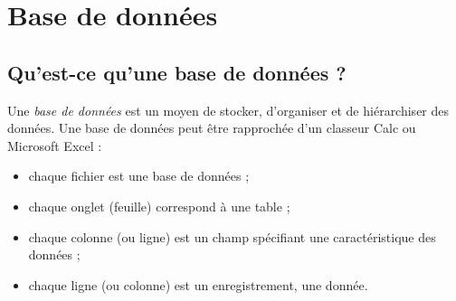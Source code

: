 \chapter{Base de données}

\section{Qu'est-ce qu'une base de données ?}

Une \emph{base de données} est un moyen de stocker, d'organiser et de hiérarchiser des données. Une base de données peut être rapprochée d'un classeur Calc ou Microsoft Excel :
\begin{itemize}
	\item chaque fichier est une base de données ;
	\item chaque onglet (feuille) correspond à une table ;
	\item chaque colonne (ou ligne) est un champ spécifiant une caractéristique des données ;
	\item chaque ligne (ou colonne) est un enregistrement, une donnée.
\end{itemize}

\Espace


